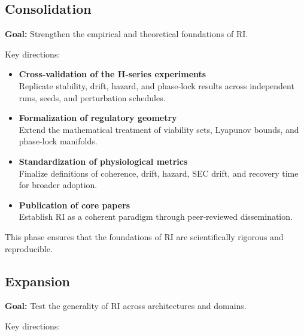 \documentclass[12pt,a4paper]{report}
\begin{document}
\subsection{Consolidation}

\textbf{Goal:} Strengthen the empirical and theoretical foundations of RI.

Key directions:

\begin{itemize}
\item \textbf{Cross‑validation of the H‑series experiments} \\
  Replicate stability, drift, hazard, and phase‑lock results across independent runs, seeds, and perturbation schedules.

\item \textbf{Formalization of regulatory geometry} \\
  Extend the mathematical treatment of viability sets, Lyapunov bounds, and phase‑lock manifolds.

\item \textbf{Standardization of physiological metrics} \\
  Finalize definitions of coherence, drift, hazard, SEC drift, and recovery time for broader adoption.

\item \textbf{Publication of core papers} \\
  Establish RI as a coherent paradigm through peer‑reviewed dissemination.
\end{itemize}

This phase ensures that the foundations of RI are scientifically rigorous and reproducible.

\subsection{Expansion}

\textbf{Goal:} Test the generality of RI across architectures and domains.

Key directions:
\end{document}
